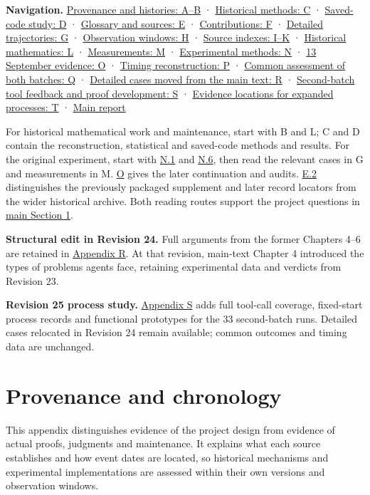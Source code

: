 \textbf{Navigation.} \hyperlink{appendix-a}{Provenance and histories: A–B} · \hyperlink{appendix-c}{Historical methods: C} · \hyperlink{appendix-d}{Saved-code study: D} · \hyperlink{appendix-e}{Glossary and sources: E} · \hyperlink{appendix-f}{Contributions: F} · \hyperlink{appendix-g}{Detailed trajectories: G} · \hyperlink{appendix-h}{Observation windows: H} · \hyperlink{appendix-i}{Source indexes: I–K} · \hyperlink{appendix-l}{Historical mathematics: L} · \hyperlink{appendix-m}{Measurements: M} · \hyperlink{appendix-n}{Experimental methods: N} · \hyperlink{appendix-o}{13 September evidence: O} · \hyperlink{appendix-p}{Timing reconstruction: P} · \hyperlink{appendix-q}{Common assessment of both batches: Q} · \hyperlink{appendix-r}{Detailed cases moved from the main text: R} · \hyperlink{appendix-s}{Second-batch tool feedback and proof development: S} · \hyperlink{appendix-t}{Evidence locations for expanded processes: T} · \href{en.pdf}{Main report}

For historical mathematical work and maintenance, start with B and L; C and D contain the reconstruction, statistical and saved-code methods and results. For the original experiment, start with \hyperlink{n1}{N.1} and \hyperlink{n6}{N.6}, then read the relevant cases in G and measurements in M. \hyperlink{appendix-o}{O} gives the later continuation and audits. \hyperlink{e2}{E.2} distinguishes the previously packaged supplement and later record locators from the wider historical archive. Both reading routes support the project questions in \href{en.pdf\#evaluation-questions}{main Section 1}.

\textbf{Structural edit in Revision 24.} Full arguments from the former Chapters 4–6 are retained in \hyperlink{appendix-r}{Appendix R}. At that revision, main-text Chapter 4 introduced the types of problems agents face, retaining experimental data and verdicts from Revision 23.

\textbf{Revision 25 process study.} \hyperlink{appendix-s}{Appendix S} adds full tool-call coverage, fixed-start process records and functional prototypes for the 33 second-batch runs. Detailed cases relocated in Revision 24 remain available; common outcomes and timing data are unchanged.

\hypertarget{appendix-a}{}

\appendix\renewcommand{\baselinestretch}{1.04}\small\setlength{\parskip}{0.35em}\section{Provenance and chronology}
This appendix distinguishes evidence of the project design from evidence of actual proofs, judgments and maintenance. It explains what each source establishes and how event dates are located, so historical mechanisms and experimental implementations are assessed within their own versions and observation windows.

